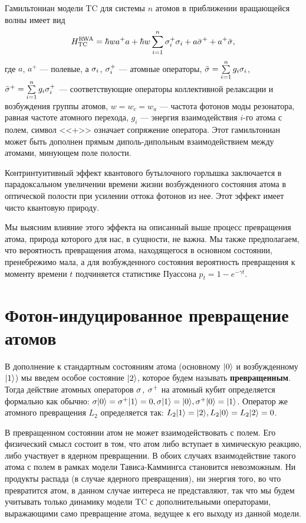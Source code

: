 Гамильтониан модели TC для системы $n$ атомов в приближении вращающейся волны \cite{ozhigov_qq, rwa_1, rwa_2} имеет вид
\[
H_{\text{\text{TC}}}^{\text{\text{RWA}}} = \hbar wa^{+}a + \hbar w\sum_{i=1}^{n}\sigma_{i}^{+}\sigma_{i} + a\bar{\sigma}^{+}+a^{+}\bar{\sigma},
\]
где $a$, $a^{+}$ --- полевые, а $\sigma_{i}$, $\sigma_{i}^{+}$ --- атомные операторы, $\bar{\sigma}=\sum\limits_{i=1}^{n}g_{i}\sigma_{i}$, $\bar{\sigma}^{+}=\sum\limits_{i=1}^ng_{i}\sigma^{+}_{i}$ --- соответствующие операторы коллективной релаксации и возбуждения группы атомов, $w = w_{c} = w_{a}$ --- частота фотонов моды резонатора, равная частоте атомного перехода, $g_{i}$ --- энергия взаимодействия $i$-го атома с полем, символ <<+>> означает сопряжение оператора. Этот гамильтониан может быть дополнен прямым диполь-дипольным взаимодействием между атомами, минующем поле полости.

Контринтуитивный эффект квантового бутылочного горлышка заключается в парадоксальном увеличении времени жизни возбужденного состояния атома в оптической полости при усилении оттока фотонов из нее. Этот эффект имеет чисто квантовую природу.

Мы выясним влияние этого эффекта на описанный выше процесс превращения атома, природа которого для нас, в сущности, не важна. Мы также предполагаем, что вероятность превращения атома, находящегося в основном состоянии, пренебрежимо мала, а для возбужденного состояния вероятность превращения к моменту времени $t$ подчиняется статистике Пуассона $p_{t} = 1-e^{-\gamma t}$.

\section{Фотон-индуцированное превращение атомов}\label{sec:ch2/sec2}

В дополнение к стандартным состояниям атома (основному $|0\rangle$ и возбужденному $|1\rangle$) мы введем особое состояние $|2\rangle$, которое будем называть \textbf{превращенным}. Тогда действие атомных операторов $\sigma$, $\sigma^{+}$ на атомный кубит определяется формально как обычно: $\sigma|0\rangle = \sigma^{+}|1\rangle = 0, \sigma|1\rangle = |0\rangle, \sigma^{+}|0\rangle = |1\rangle$. Оператор же атомного превращения $L_{2}$ определяется так: $L_{2}|1\rangle = |2\rangle, L_{2}|0\rangle = L_{2}|2\rangle = 0$.

В превращенном состоянии атом не может взаимодействовать с полем. Его физический смысл состоит в том, что атом либо вступает в химическую реакцию, либо участвует в ядерном превращении. В обоих случаях взаимодействие такого атома с полем в рамках модели Тависа-Каммингса становится невозможным. Ни продукты распада (в случае ядерного превращения), ни энергия того, во что превратится атом, в данном случае интереса не представляют, так что мы будем учитывать только динамику модели TC с дополнительными операторами, выражающими само превращение атома, ведущее к его выходу из данной модели.

